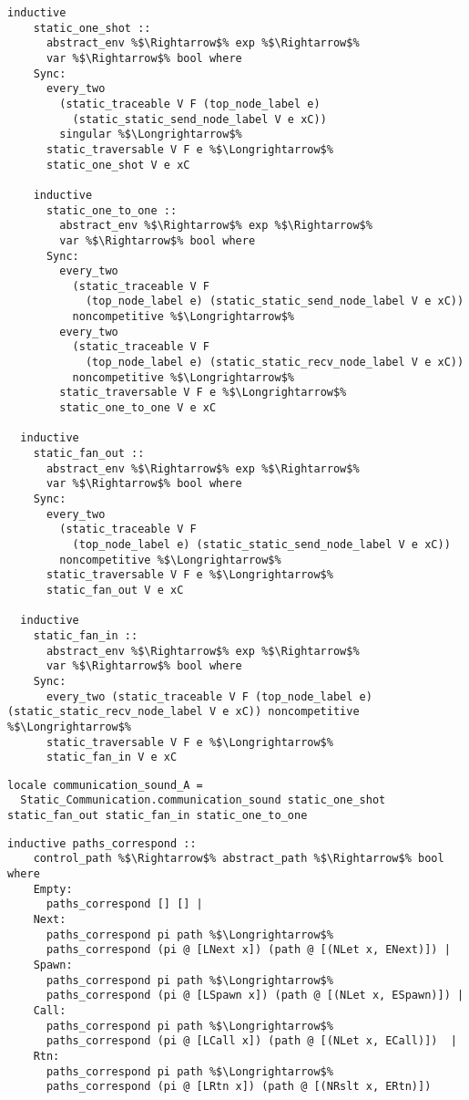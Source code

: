 \documentclass{article}
\begin{document}
\begin{lstlisting}[style=codestyle1, escapechar=\%]
  inductive
    static_one_shot ::
      abstract_env %$\Rightarrow$% exp %$\Rightarrow$%
      var %$\Rightarrow$% bool where
    Sync:
      every_two
        (static_traceable V F (top_node_label e)
          (static_static_send_node_label V e xC))
        singular %$\Longrightarrow$%
      static_traversable V F e %$\Longrightarrow$%
      static_one_shot V e xC 

    inductive
      static_one_to_one ::
        abstract_env %$\Rightarrow$% exp %$\Rightarrow$%
        var %$\Rightarrow$% bool where
      Sync:
        every_two
          (static_traceable V F
            (top_node_label e) (static_static_send_node_label V e xC))
          noncompetitive %$\Longrightarrow$%
        every_two
          (static_traceable V F
            (top_node_label e) (static_static_recv_node_label V e xC))
          noncompetitive %$\Longrightarrow$%
        static_traversable V F e %$\Longrightarrow$%
        static_one_to_one V e xC 

  inductive
    static_fan_out ::
      abstract_env %$\Rightarrow$% exp %$\Rightarrow$%
      var %$\Rightarrow$% bool where
    Sync:
      every_two
        (static_traceable V F
          (top_node_label e) (static_static_send_node_label V e xC))
        noncompetitive %$\Longrightarrow$%
      static_traversable V F e %$\Longrightarrow$%
      static_fan_out V e xC 

  inductive
    static_fan_in ::
      abstract_env %$\Rightarrow$% exp %$\Rightarrow$%
      var %$\Rightarrow$% bool where
    Sync:
      every_two (static_traceable V F (top_node_label e) (static_static_recv_node_label V e xC)) noncompetitive %$\Longrightarrow$%
      static_traversable V F e %$\Longrightarrow$%
      static_fan_in V e xC

    \end{lstlisting}

\begin{lstlisting}[style=codestyle1, escapechar=\%]
locale communication_sound_A = 
  Static_Communication.communication_sound static_one_shot static_fan_out static_fan_in static_one_to_one
    \end{lstlisting}

\begin{lstlisting}[style=codestyle1, escapechar=\%]
  inductive paths_correspond ::
    control_path %$\Rightarrow$% abstract_path %$\Rightarrow$% bool where
    Empty:
      paths_correspond [] [] |
    Next:
      paths_correspond pi path %$\Longrightarrow$%
      paths_correspond (pi @ [LNext x]) (path @ [(NLet x, ENext)]) |
    Spawn:
      paths_correspond pi path %$\Longrightarrow$%
      paths_correspond (pi @ [LSpawn x]) (path @ [(NLet x, ESpawn)]) |
    Call:
      paths_correspond pi path %$\Longrightarrow$%
      paths_correspond (pi @ [LCall x]) (path @ [(NLet x, ECall)])  |
    Rtn:
      paths_correspond pi path %$\Longrightarrow$%
      paths_correspond (pi @ [LRtn x]) (path @ [(NRslt x, ERtn)]) 
  \end{lstlisting}
\end{document}
